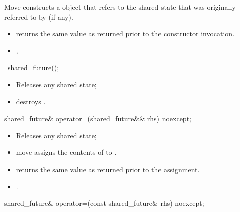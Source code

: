 \begin{itemdescr}
\pnum
\effects
Move constructs a  object that refers to the
shared state that was originally referred to by  (if any).

\pnum
\ensures
\begin{itemize}
\item {} returns the same value as  returned prior to
the constructor invocation.
\item {}.
\end{itemize}
\end{itemdescr}

%
\begin{itemdecl}
~shared_future();
\end{itemdecl}

\begin{itemdescr}
\pnum
\effects
\begin{itemize}
\item
Releases any shared state;
\item
destroys .
\end{itemize}
\end{itemdescr}

%
\begin{itemdecl}
shared_future& operator=(shared_future&& rhs) noexcept;
\end{itemdecl}

\begin{itemdescr}
\pnum
\effects
\begin{itemize}
\item
Releases any shared state;
\item
move assigns the contents of  to .
\end{itemize}

\pnum
\ensures
\begin{itemize}
\item
{} returns the same value as  returned prior to
the assignment.

\item
{}.
\end{itemize}
\end{itemdescr}

%
\begin{itemdecl}
shared_future& operator=(const shared_future& rhs) noexcept;
\end{itemdecl}

